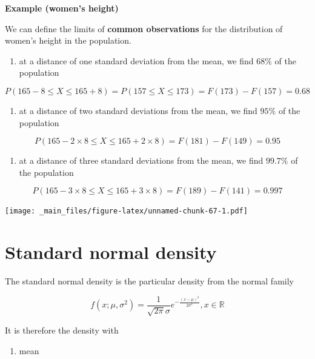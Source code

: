 \documentclass[
]{book}
\providecommand{\tightlist}{%
  \setlength{\itemsep}{0pt}\setlength{\parskip}{0pt}}
\begin{document}
\textbf{Example (women's height)}

We can define the limits of \textbf{common observations} for the distribution of women's height in the population.

\begin{enumerate}
\def\labelenumi{\arabic{enumi})}
\tightlist
\item
  at a distance of one standard deviation from the mean, we find \(68\%\) of the population
\end{enumerate}

\[P(165-8 \leq X \leq 165+8)=P(157 \leq X \leq 173)=F(173)-F(157)=0.68\]

\begin{enumerate}
\def\labelenumi{\arabic{enumi})}
\setcounter{enumi}{1}
\tightlist
\item
  at a distance of two standard deviations from the mean, we find \(95\%\) of the population
\end{enumerate}

\[P(165-2 \times 8 \leq X \leq 165+2\times 8)=F(181)-F(149)=0.95\]

\begin{enumerate}
\def\labelenumi{\arabic{enumi})}
\setcounter{enumi}{2}
\tightlist
\item
  at a distance of three standard deviations from the mean, we find \(99.7\%\) of the population
\end{enumerate}

\[P(165-3 \times 8 \leq X \leq 165+3\times 8)=F(189)-F(141)=0.997\]

\texttt{[image: \_main\_files/figure-latex/unnamed-chunk-67-1.pdf]}

\hypertarget{standard-normal-density}{%
\section{Standard normal density}\label{standard-normal-density}}

The standard normal density is the particular density from the normal family

\[f(x; \mu, \sigma^2)=\frac{1}{\sqrt{2\pi}\sigma}e^{-\frac{(x-\mu)^2}{2\sigma^2}}, x \in {\mathbb R}\]

It is therefore the density with

\begin{enumerate}
\def\labelenumi{\arabic{enumi})}
\tightlist
\item
  mean
\end{enumerate}
\end{document}
